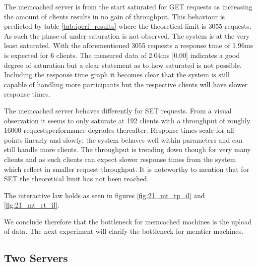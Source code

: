             The memcached server is from the start saturated for GET requests as increasing the amount of
            clients results in no gain of throughput. This behaviour is predicted by table \ref{tab:iperf_results}
            where the theoretical limit is 3055 requests. As such the phase of under-saturation is not observed. The
            system is at the very least saturated.  With the aforementioned 3055 requests a response time of 1.96ms
            is expected for 6 clients. The measured data of 2.04ms [0.00] indicates a good degree of saturation but
            a clear statement as to how saturated is not possible. Including the response time graph it becomes
            clear that the system is still capable of handling more participants but the respective clients will
            have slower response times.

            The memcached server behaves differently for SET requests. From a visual observation it seems to only
            saturate at 192 clients with a throughput of roughly 16000 requests\textemdash performance degrades
            thereafter. Response times scale for all points linearly and slowly; the system behaves well within
            parameters and can still handle more clients. The throughput is trending down though for very many clients
            and as such clients can expect slower response times from the system which reflect in smaller request
            throughput. It is noteworthy to mention that for SET the theoretical limit has not been reached.

            The interactive law holds as seen in figures \ref{fig:21_mt_tp_il} and \ref{fig:21_mt_rt_il}.

            We conclude therefore that the bottleneck for memcached machines is the upload of data. The next
            experiment will clarify the bottleneck for memtier machines.

    \subsection{Two Servers\label{subsec:2_two-servers}}

